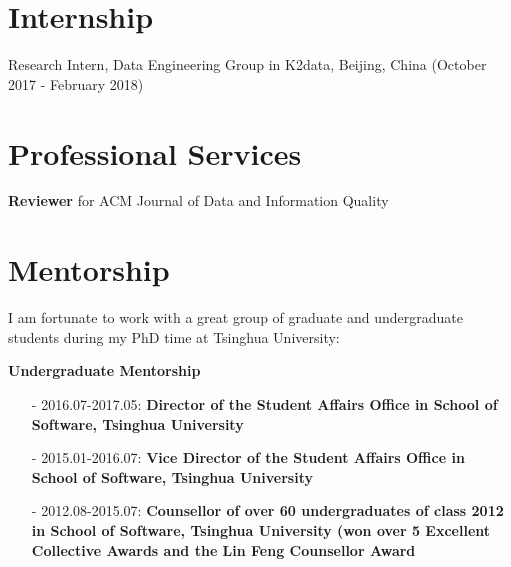 \documentclass[margin]{cv}
\begin{document}
\begin{resume}
\section{\sc Internship}
Research Intern, Data Engineering Group in K2data, Beijing, China (October 2017 - February 2018)

\section{\sc Professional Services}
\textbf{Reviewer} for ACM Journal of Data and Information Quality

\section{\sc Mentorship}
I am fortunate to work with a great group of graduate and undergraduate students during my PhD time at Tsinghua University:

{\bf Undergraduate Mentorship}

\leftmargini=4mm
\begin{itemize}
\item[-] 2016.07-2017.05: {\bf Director of the Student Affairs Office in School of Software, Tsinghua University}
\item[-] 2015.01-2016.07: {\bf Vice Director of the Student Affairs Office in School of Software, Tsinghua University}
\item[-] 2012.08-2015.07: {\bf Counsellor of over 60 undergraduates of class 2012 in School of Software, Tsinghua University (won over 5 Excellent Collective Awards and the Lin Feng Counsellor Award}
\end{itemize}

\end{resume}
\end{document}
